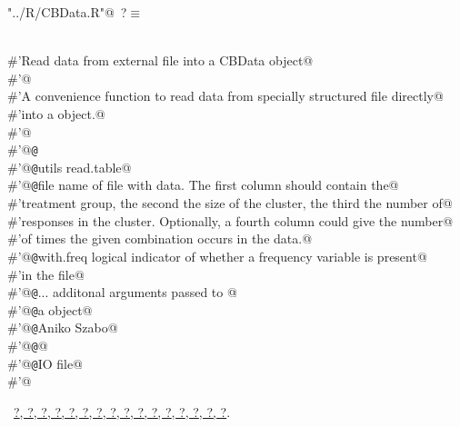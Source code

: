 \documentclass[reqno]{amsart}
\renewcommand{\NWtarget}[2]{\hypertarget{#1}{#2}}
\renewcommand{\NWlink}[2]{\hyperlink{#1}{#2}}
\begin{document}
\begin{flushleft} \small
\begin{minipage}{\linewidth}\label{scrap4}\raggedright\small
\NWtarget{nuweb?}{} \verb@"../R/CBData.R"@\nobreak\ {\footnotesize {?}}$\equiv$
\vspace{-1ex}
\begin{list}{}{} \item
\mbox{}\verb@@\\
\mbox{}\verb@#'Read data from external file into a CBData object@\\
\mbox{}\verb@#'@\\
\mbox{}\verb@#'A convenience function to read data from specially structured file directly@\\
\mbox{}\verb@#'into a  object.@\\
\mbox{}\verb@#'@\\
\mbox{}\verb@#'@{\tt @}\verb@export@\\
\mbox{}\verb@#'@{\tt @}\verb@importFrom utils read.table@\\
\mbox{}\verb@#'@{\tt @}\verb@param file name of file with data. The first column should contain the@\\
\mbox{}\verb@#'treatment group, the second the size of the cluster, the third the number of@\\
\mbox{}\verb@#'responses in the cluster. Optionally, a fourth column could give the number@\\
\mbox{}\verb@#'of times the given combination occurs in the data.@\\
\mbox{}\verb@#'@{\tt @}\verb@param with.freq logical indicator of whether a frequency variable is present@\\
\mbox{}\verb@#'in the file@\\
\mbox{}\verb@#'@{\tt @}\verb@param ... additonal arguments passed to @\\
\mbox{}\verb@#'@{\tt @}\verb@return a  object@\\
\mbox{}\verb@#'@{\tt @}\verb@author Aniko Szabo@\\
\mbox{}\verb@#'@{\tt @}\verb@seealso {}@\\
\mbox{}\verb@#'@{\tt @}\verb@keywords IO file@\\
\mbox{}\verb@#'@\\
\mbox{}\verb@@{\NWsep}
\end{list}
\vspace{-1.5ex}
\footnotesize
\begin{list}{}{\setlength{\itemsep}{-\parsep}\setlength{\itemindent}{-\leftmargin}}
\item \NWtxtFileDefBy\ \NWlink{nuweb?}{?}\NWlink{nuweb?}{, ?}\NWlink{nuweb?}{, ?}\NWlink{nuweb?}{, ?}\NWlink{nuweb?}{, ?}\NWlink{nuweb?}{, ?}\NWlink{nuweb?}{, ?}\NWlink{nuweb?}{, ?}\NWlink{nuweb?}{, ?}\NWlink{nuweb?}{, ?}\NWlink{nuweb?}{, ?}\NWlink{nuweb?}{, ?}\NWlink{nuweb?}{, ?}\NWlink{nuweb?}{, ?}\NWlink{nuweb?}{, ?}\NWlink{nuweb?}{, ?}.

\item{}
\end{list}
\end{minipage}\vspace{4ex}
\end{flushleft}
\end{document}
